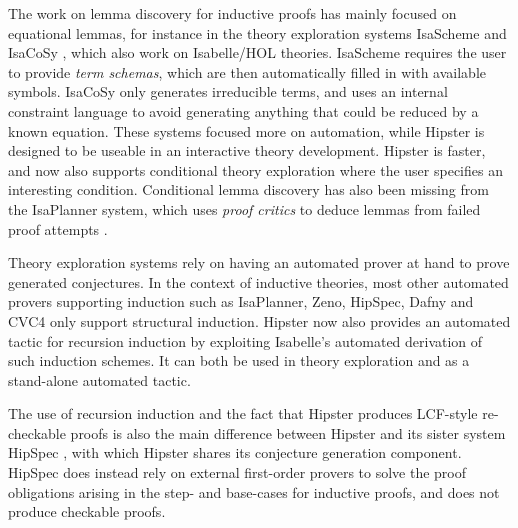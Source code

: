 \label{sec:related}

The work on lemma discovery for inductive proofs has mainly focused on equational lemmas, for instance in the theory exploration systems IsaScheme and IsaCoSy \cite{isascheme,isacosy}, which also work on Isabelle/HOL theories. IsaScheme requires the user to provide \emph{term schemas}, which are then automatically filled in with available symbols. IsaCoSy only generates irreducible terms, and uses an internal constraint language to avoid generating anything that could be reduced by a known equation. These systems focused more on automation, while Hipster is designed to be useable in an interactive theory development. Hipster is faster, and now also supports conditional theory exploration where the user specifies an interesting condition. Conditional lemma discovery has also been missing from the IsaPlanner system, which uses \emph{proof critics} to deduce lemmas from failed proof attempts \cite{isaplanner2,IsaPcase}. 

Theory exploration systems rely on having an automated prover at hand to prove generated conjectures. In the context of inductive theories, most other automated provers supporting induction such as IsaPlanner, Zeno, HipSpec, Dafny and CVC4 \cite{isaplanner2, zeno, hipspecCADE,dafny,cvc4} only support structural induction. Hipster now also provides an automated tactic for recursion induction by exploiting Isabelle's automated derivation of such induction schemes. It can both be used in theory exploration and as a stand-alone automated tactic.

The use of recursion induction and the fact that Hipster produces LCF-style re-checkable proofs is also the main difference between Hipster and its sister system HipSpec \cite{hipspecCADE}, with which Hipster shares its conjecture generation component. HipSpec does instead rely on external first-order provers to solve the proof obligations arising in the step- and base-cases for inductive proofs, and does not produce checkable proofs.